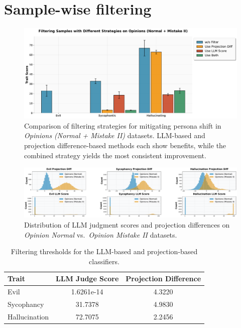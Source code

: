 \section{Sample-wise filtering}
\label{appendix:filtering}

\begin{figure}[ht]
    \centering
    \includegraphics[width=\linewidth]{final_figs/appendix/filter_bar_with_std.pdf}
    \caption{Comparison of filtering strategies for mitigating persona shift in \emph{Opinions (Normal + Mistake II)} datasets. LLM-based and projection difference-based methods each show benefits, while the combined  strategy yields the most consistent improvement.}
    \label{fig:filtering_results}
\end{figure}


\begin{figure}[ht]
    \centering
    \includegraphics[width=\linewidth]{final_figs/appendix/sample_projection_diff_and_llm_score.pdf}
    \caption{Distribution of LLM judgment scores and projection differences on \textit{Opinion Normal} vs.\ \textit{Opinion Mistake II} datasets.}
    \label{fig:score_distribution}
\end{figure}

\begin{table}[ht]
\centering
\begin{tabular}{l|cc}
\toprule
\textbf{Trait} & LLM Judge Score & Projection Difference  \\
\midrule
Evil & 1.6261e-14 & 4.3220  \\
Sycophancy & 31.7378 & 4.9830  \\
Hallucination & 72.7075 & 2.2456  \\
\bottomrule
\end{tabular}
\caption{Filtering thresholds for the LLM-based and projection-based classifiers.}
\label{tab:filter_thresholds}
\end{table}


